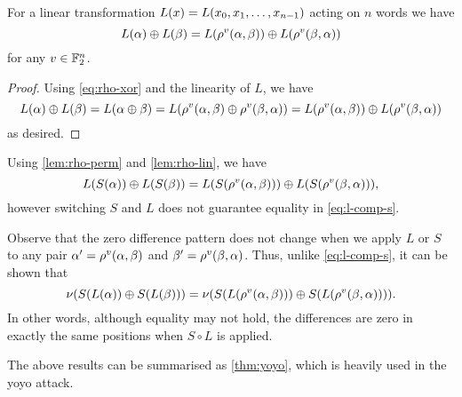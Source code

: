 \documentclass[twoside]{article}
\begin{document}
\begin{lemma}
    \label{lem:rho-lin}
    For a linear transformation \(L(x) = L(x_0, x_1, \ldots, x_{n -
    1})\) acting on \(n\) words we have
    \begin{equation}
        L(\alpha) \oplus L(\beta) = L(\rho^v(\alpha, \beta)) \oplus L(\rho^v(\beta, \alpha))
    \end{equation}
    for any \(v \in \mathbb F_2^n\).
\end{lemma}
\begin{proof}
    Using \eqref{eq:rho-xor} and the linearity of \(L\), we have
    \begin{equation}
        L(\alpha) \oplus L(\beta) = L(\alpha \oplus \beta) = L(\rho^v(\alpha, \beta) \oplus \rho^v(\beta, \alpha)) = L(\rho^v(\alpha, \beta)) \oplus L(\rho^v(\beta, \alpha))
    \end{equation}
    as desired.
\end{proof}

Using \autoref{lem:rho-perm} and \autoref{lem:rho-lin}, we have
\begin{equation}
    L(S(\alpha)) \oplus L(S(\beta)) = L(S(\rho^v(\alpha, \beta))) \oplus L(S(\rho^v(\beta, \alpha))),
    \label{eq:l-comp-s}
\end{equation}
however switching \(S\) and \(L\) does not guarantee equality in
\eqref{eq:l-comp-s}.

Observe that the zero difference pattern does not change when we apply \(L\) or
\(S\) to any pair \(\alpha^\prime = \rho^v(\alpha, \beta)\) and
\(\beta^\prime = \rho^v(\beta, \alpha)\). Thus, unlike \eqref{eq:l-comp-s},
it can be shown that
\begin{equation}
    \nu(S(L(\alpha)) \oplus S(L(\beta))) = \nu(S(L(\rho^v(\alpha, \beta))) \oplus S(L(\rho^v(\beta, \alpha)))).
    \label{eq:nu-s-comp-l}
\end{equation}
In other words, although equality may not hold, the differences are zero in
exactly the same positions when \(S \circ L\) is applied.

The above results can be summarised as \autoref{thm:yoyo}, which is heavily used
in the yoyo attack.
\end{document}
